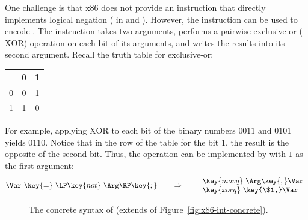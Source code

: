 \documentclass[11pt]{book}
\newcommand{\gray}[1]{{\color{gray} #1}}
\newcommand{\ocaml}[1]{{\color{blue}{#1}}}
\begin{document}
{One challenge is that x86 does not provide an instruction that
directly implements logical negation ( in \LangIf{} and
\LangCIf{}).  However, the  instruction can be used to
encode .  The  instruction takes two arguments,
performs a pairwise exclusive-or ($\mathrm{XOR}$) operation on each
bit of its arguments, and writes the results into its second argument.
Recall the truth table for exclusive-or:
\begin{center}
\begin{tabular}{l|cc}
   & 0 & 1 \\ \hline
0  & 0 & 1 \\
1  & 1 & 0
\end{tabular}
\end{center}
For example, applying $\mathrm{XOR}$ to each bit of the binary numbers
$0011$ and $0101$ yields $0110$. Notice that in the row of the table
for the bit $1$, the result is the opposite of the second bit.  Thus,
the  operation can be implemented by  with $1$ as
the first argument:
\[
\Var~ \key{=}~ \LP\key{not}~\Arg\RP\key{;}
\qquad\Rightarrow\qquad
\begin{array}{l}
\key{movq}~ \Arg\key{,} \Var\\
\key{xorq}~ \key{\$1,} \Var
\end{array}
\]


\begin{figure}[tp]
\fbox{
\begin{minipage}{0.96\textwidth}
\[
\begin{array}{lcl}
  \itm{bytereg} &::=& \key{ah} \mid \key{al} \mid \key{bh} \mid \key{bl}
    \mid \key{ch} \mid \key{cl} \mid \key{dh} \mid \key{dl} \\
\Arg &::=& \gray{ \key{\$}\Int \mid \key{\%}\Reg \mid \Int\key{(}\key{\%}\Reg\key{)} } \mid \key{\%}\itm{bytereg}\\
\itm{cc} & ::= & \key{e} \mid \key{l} \mid \key{le} \mid \key{g} \mid \key{ge} \\
\Instr &::=& \gray{ \key{addq} \; \Arg\key{,} \Arg \mid
      \key{subq} \; \Arg\key{,} \Arg \mid
      \key{negq} \; \Arg \mid \key{movq} \; \Arg\key{,} \Arg \mid } \\
  && \ocaml{\key{movabsq} \; \Arg\key{,} \Arg \mid} \\
  &&  \gray{ \key{callq} \; \itm{label} \mid
      \key{pushq}\;\Arg \mid \key{popq}\;\Arg \mid \key{retq} \mid \key{jmp}\,\itm{label} } \\
  && \gray{ \itm{label}\key{:}\; \Instr }
     \mid \key{xorq}~\Arg\key{,}~\Arg
     \mid \key{cmpq}~\Arg\key{,}~\Arg  \mid \\
  &&  \key{set}cc~\Arg
     \mid \key{movzbq}~\Arg\key{,}~\Arg
     \mid \key{j}cc~\itm{label}
     \\
\LangXIf{} &::= & \gray{ \key{.globl main} }\\
      &    & \gray{ \key{main:} \; \Instr\ldots }
\end{array}
\]
\end{minipage}
}
\caption{The concrete syntax of \LangXIf{}  (extends \LangXInt{} of Figure~\ref{fig:x86-int-concrete}).}
\label{fig:x86-1-concrete}
\end{figure}



}
\end{document}
